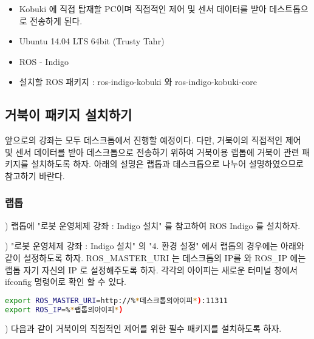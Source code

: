 \begin{itemize}[leftmargin=*]
\item Kobuki 에 직접 탑재할 PC이며 직접적인 제어 및 센서 데이터를 받아 데스트톱으로 전송하게 된다.
\item Ubuntu 14.04 LTS 64bit (Trusty Tahr)
\item ROS - Indigo
\item 설치할 ROS 패키지 : ros-indigo-kobuki 와 ros-indigo-kobuki-core
 \end{itemize}

\subsection{거북이 패키지 설치하기}

앞으로의 강좌는 모두 데스크톱에서 진행할 예정이다. 다만, 거북이의 직접적인 제어 및 센서 데이터를 받아 데스크톱으로 전송하기 위하여 거북이용 랩톱에 거북이 관련 패키지를 설치하도록 하자. 아래의 설명은 랩톱과 데스크톱으로 나누어 설명하였으므로 참고하기 바란다.

\subsubsection{랩톱}

\setcounter{num}{0}

\vspace{\baselineskip}
\noindent{}
\thenum) 랩톱에 "로봇 운영체제 강좌 : Indigo 설치" 를 참고하여 ROS Indigo 를 설치하자. 

\vspace{\baselineskip}
\noindent{}
\thenum) "로봇 운영체제 강좌 : Indigo 설치" 의 "4. 환경 설정" 에서 랩톱의 경우에는 아래와 같이 설정하도록 하자. ROS\_MASTER\_URI 는 데스크톱의 IP를 와 ROS\_IP 에는 랩톱 자기 자신의  IP 로 설정해주도록 하자. 각각의 아이피는 새로운 터미널 창에서 ifconfig 명령어로 확인 할 수 있다.

\begin{lstlisting}[language=bash]
export ROS_MASTER_URI=http://%*데스크톱의아이피*):11311
export ROS_IP=%*랩톱의아이피*)
\end{lstlisting}

\vspace{\baselineskip}
\noindent{}
\thenum) 다음과 같이 거북이의 직접적인 제어를 위한 필수 패키지를 설치하도록 하자.

